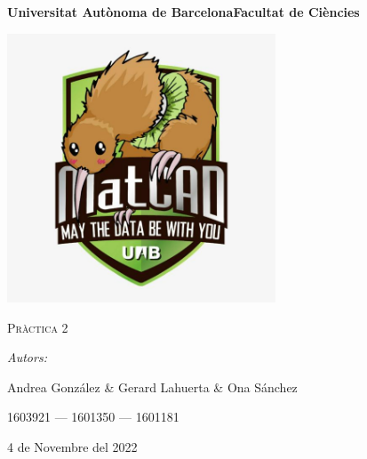 \documentclass[a4paper, 11pt]{article}
\begin{document}
\begin{titlepage}
    \centering
    {\bfseries\LARGE \hspace{1.9em} Universitat Autònoma de Barcelona\newline Facultat de Ciències\par}
    \vspace{2cm}
    {\hspace{-1em}\includegraphics[width=0.6\textwidth]{MatCAD3.jpg}\par}
    \vspace{1cm}
    {\scshape\Huge Pràctica 2\par} 
    \vspace{1cm}
    {\Large \itshape Autors: \par}
    \vspace{0.5cm}
    {\Large Andrea González \& Gerard Lahuerta \& Ona Sánchez \par}
    \vspace{0.5cm}
    {\Large 1603921 --- 1601350 --- 1601181 \par}
    \vspace{1cm}
    {\Large 4 de Novembre del 2022\par}
\end{titlepage}

\justifying

\newpage
{
\small
\setcounter{page}{2}
\pagestyle{plain}
\tableofcontents
\cleardoublepage
{}
}
\newpage
\end{document}
